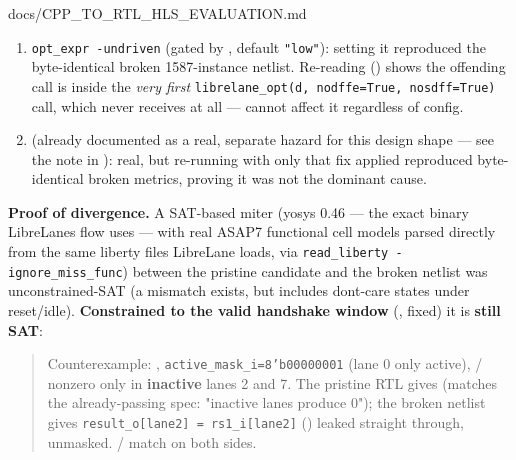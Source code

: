 \begin{relocated}{docs/CPP_TO_RTL_HLS_EVALUATION.md}
\begin{enumerate}
\def\labelenumi{\arabic{enumi}.}
\tightlist
\item
  \texttt{opt\_\allowbreak{}expr\ -\allowbreak{}undriven} (gated by
  , default \texttt{"low"}): setting it
   reproduced the byte-identical broken 1587-instance
  netlist. Re-reading 
  () shows the offending
   call is inside the \emph{very first}
  \texttt{librelane\_\allowbreak{}opt(d,\allowbreak{}\ nodffe=\allowbreak{}True,\allowbreak{}\ nosdff=\allowbreak{}True)}
  call, which never receives  at all ---
   cannot affect it regardless of config.
\item
   (already documented as a real, separate
  hazard for this design shape --- see the note in
  ): real, but re-running with
  only that fix applied reproduced byte-identical broken metrics,
  proving it was not the dominant cause.
\end{enumerate}

\textbf{Proof of divergence.} A SAT-based miter (yosys 0.46 --- the
exact binary LibreLane\textquotesingle s flow uses --- with real ASAP7
functional cell models parsed directly from the same liberty files
LibreLane loads, via
\texttt{read\_\allowbreak{}liberty\ -\allowbreak{}ignore\_\allowbreak{}miss\_\allowbreak{}func})
between the pristine candidate and the broken netlist was
unconstrained-SAT (a mismatch exists, but includes
don\textquotesingle t-care states under reset/\allowbreak{}idle).
\textbf{Constrained to the valid handshake window} (,
 fixed) it is \textbf{still SAT}:

\begin{quote}
Counterexample: ,
\texttt{active\_\allowbreak{}mask\_\allowbreak{}i=\allowbreak{}8'b00000001}
(lane 0 only active), / nonzero only in
\textbf{inactive} lanes 2 and 7. The pristine RTL gives
 (matches the already-passing 
spec: "inactive lanes produce 0"); the broken netlist gives
\texttt{result\_\allowbreak{}o[lane2]\ =\allowbreak{}\ rs1\_\allowbreak{}i[lane2]}
() leaked straight through, unmasked.
/ match on both sides.
\end{quote}


\end{relocated}
